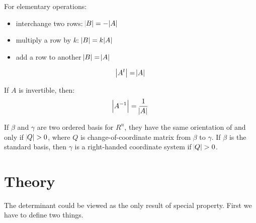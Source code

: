 \begin{theorem}
  For elementary operations:
\begin{itemize}
    \item interchange two rows: $\abs{B} = - \abs{A}$ 
    \item multiply a row by $k$: $\abs{B} = k \abs{A}$
    \item add a row to another $\abs{B} = \abs{A}$
\end{itemize}  
\end{theorem}

\begin{theorem}
    \begin{equation}
        \abs{A^t} = \abs{A}
    \end{equation}    
\end{theorem}

\begin{theorem}
    If $A$ is invertible, then:
    \begin{equation}
        \abs{{A}^{-1}} = \frac{1}{\abs{A}}
    \end{equation}    
\end{theorem}




\begin{definition}
    If $\beta$ and $\gamma$ are two ordered basis for $R^n$, they have the same orientation of and only if $\abs{Q} > 0$, where $Q$ is change-of-coordinate matrix from $\beta$ to $\gamma$. If $\beta$ is the standard basis, then $\gamma$ is a right-handed coordinate system if $\abs{Q} > 0$.
\end{definition}


\section{Theory}

The determinant could be viewed as the only result of special property. First we have to define two things.

